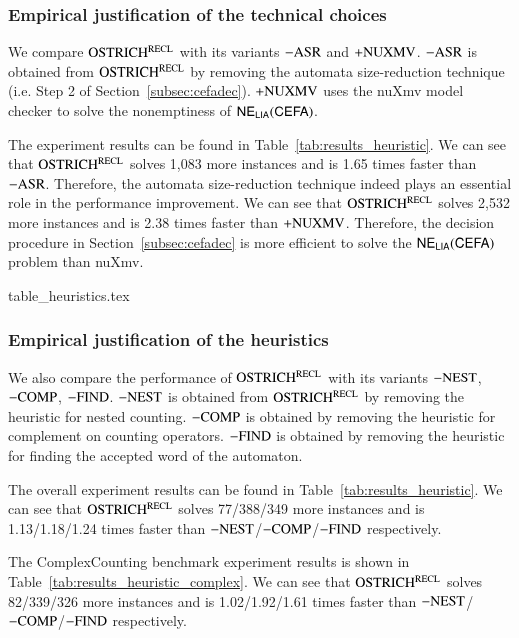 \subsubsection{Empirical justification of the technical choices}
We compare $\rm OSTRICH^{RECL}$ with its variants ${\rm -ASR}$ and ${\rm +NUXMV}$. ${\rm -ASR}$ is obtained from $\rm OSTRICH^{RECL}$ by removing the automata size-reduction technique (i.e. Step 2 of Section~\ref{subsec:cefadec}). ${\rm +NUXMV}$ uses the nuXmv model checker to solve the nonemptiness of ${\sf NE_{LIA}(CEFA)}$. 

The experiment results can be found in Table~\ref{tab:results_heuristic}.
We can see that $\rm OSTRICH^{RECL}$ solves 1,083 more instances and is 1.65 times faster than ${\rm -ASR}$. Therefore,  the automata size-reduction technique indeed plays an essential role in the performance improvement.
We can see that $\rm OSTRICH^{RECL}$ solves 2,532 more instances and is 2.38 times faster than ${\rm +NUXMV}$. Therefore, the decision procedure in Section~\ref{subsec:cefadec} is more efficient to solve the ${\sf NE_{LIA}(CEFA)}$ problem than nuXmv. 
\begin{table}
  {table_heuristics.tex}
  \caption{Empirical justification of the technical choices and heuristics}\label{tab:results_heuristic}
\end{table}

\subsubsection{Empirical justification of the heuristics} 
We also compare the performance of $\rm OSTRICH^{RECL}$ with its variants ${\rm -NEST}$, ${\rm -COMP}$, ${\rm -FIND}$. ${\rm -NEST}$ is obtained from $\rm OSTRICH^{RECL}$ by removing the heuristic for nested counting. ${\rm -COMP}$ is obtained by removing the heuristic for complement on counting operators. ${\rm -FIND}$ is obtained by removing the heuristic for finding the accepted word of the automaton.

The overall experiment results can be found in Table~\ref{tab:results_heuristic}. We can see that $\rm OSTRICH^{RECL}$ solves 77/388/349 more instances and is 1.13/1.18/1.24 times faster than ${\rm -NEST}$/${\rm -COMP}$/${\rm -FIND}$ respectively. 

The ComplexCounting benchmark experiment results is shown in Table~\ref{tab:results_heuristic_complex}. We can see that $\rm OSTRICH^{RECL}$ solves 82/339/326 more instances and is 1.02/1.92/1.61 times faster than ${\rm -NEST}$/${\rm -COMP}$/${\rm -FIND}$ respectively.

